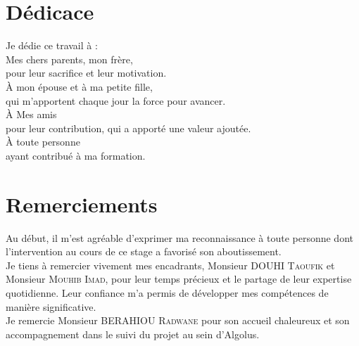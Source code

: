 \documentclass[12pt,a4paper]{report}
\begin{document}
	 
	
	
	
	\chapter*{Dédicace}
	
	\begin{center}
		\begin{minipage}{0.8\textwidth} %
			\centering
			\Large\itshape %
			
			Je dédie ce travail à :\\[1.5em] %
			
			Mes chers parents, mon frère,  \\
			pour leur sacrifice et leur motivation.\\[1em]
			
			À mon épouse et à ma petite fille,  \\
			qui m’apportent chaque jour la force pour avancer.\\[1em]
			
			À Mes amis \\
			pour leur contribution, qui a apporté une valeur ajoutée.\\[1em]
			
			À toute personne \\
			ayant contribué à ma formation.
			
		\end{minipage}
	\end{center}
	
	
	\chapter*{Remerciements}
			
	Au début, il m'est agréable d'exprimer ma reconnaissance à toute personne dont l'intervention au cours de ce stage a favorisé son aboutissement.\\
			
	Je tiens à remercier vivement mes encadrants, Monsieur \textsc{DOUHI Taoufik} et Monsieur \textsc{Mouhib Imad}, pour leur temps précieux et le partage de leur expertise quotidienne. Leur confiance m'a permis de développer mes compétences de manière significative.\\[0.6em]
				
	Je remercie Monsieur \textsc{BERAHIOU Radwane} pour son accueil chaleureux et son accompagnement dans le suivi du projet au sein d'Algolus.\\[0.6em]
				
\end{document}
